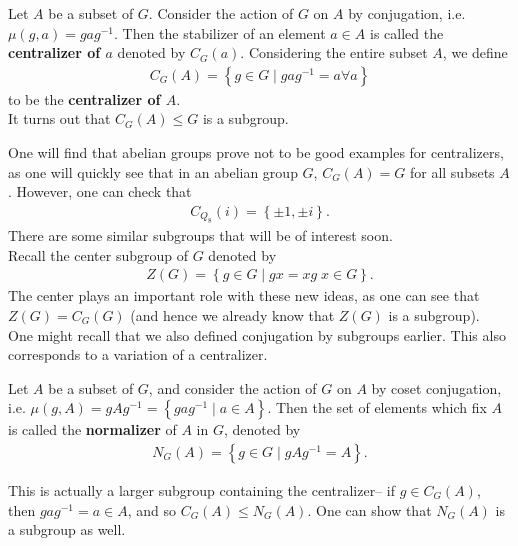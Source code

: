 \documentclass{memoir}
\begin{document}
\begin{exmp}
	Let \(A\) be a subset of \(G\). Consider the action of \(G\) on \(A\) by conjugation, i.e. \(\mu (g,a) = gag^{-1}\). Then the stabilizer of an element \(a \in A\) is called the \textbf{centralizer of \(a\)} denoted by \(C_G(a)\). Considering the entire subset \(A\), we define
	\begin{align*}
		C_G(A) = \left\{g \in G \mid gag^{-1} = a \forall a \right\} 
	\end{align*}
	to be the \textbf{centralizer of \(A\)}.\\

	It turns out that \(C_G(A) \leq G\) is a subgroup.
\end{exmp}
One will find that abelian groups prove not to be good examples for centralizers, as one will quickly see that in an abelian group \(G\), \(C_G(A) = G\) for all subsets \(A\). However, one can check that
\begin{align*}
	C_{Q_8}(i) = \left\{ \pm 1, \pm i \right\} .
\end{align*}
There are some similar subgroups that will be of interest soon.\\

Recall the center subgroup of \(G\) denoted by
	\begin{align*}
		Z(G) = \left\{g \in G \mid gx = xg \; x \in G \right\} .
	\end{align*}
The center plays an important role with these new ideas, as one can see that \(Z(G) = C_G(G)\) (and hence we already know that \(Z(G)\) is a subgroup).\\

One might recall that we also defined conjugation by subgroups earlier. This also corresponds to a variation of a centralizer.

\begin{defn}[Normalizer]
	Let \(A\) be a subset of \(G\), and consider the action of \(G\) on \(A\) by coset conjugation, i.e. \(\mu (g,A) = gAg^{-1} = \left\{gag^{-1}  \mid a \in A \right\} \). Then the set of elements which fix \(A\) is called the \textbf{normalizer} of \(A\) in \(G\), denoted by
	\begin{align*}
		N_G(A) = \left\{g \in G \mid gAg^{-1} = A \right\} .
	\end{align*}
\end{defn}
This is actually a larger subgroup containing the centralizer-- if \(g \in C_G(A)\), then \(gag^{-1} = a \in A\), and so \(C_G(A) \leq N_G(A)\). One can show that \(N_G(A)\) is a subgroup as well.
\end{document}

